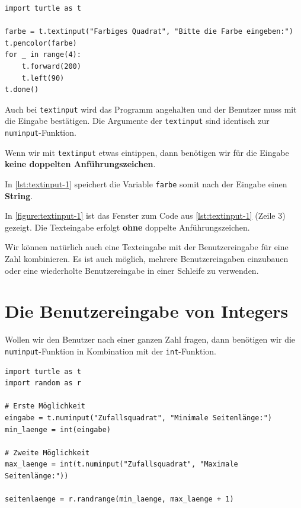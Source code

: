 \begin{lstlisting}[language={python3}, label={lst:textinput-1}, caption={Das Konzept für die Benutzereingabe eines Strings ist praktisch identisch mit dem Konzept für die Benutzereingabe eines Floats.}]
import turtle as t

farbe = t.textinput("Farbiges Quadrat", "Bitte die Farbe eingeben:")
t.pencolor(farbe)
for _ in range(4):
	t.forward(200)
	t.left(90)
t.done()

\end{lstlisting}

Auch bei \lstinline[language={python3}]{textinput} wird das Programm angehalten und der Benutzer muss mit  die Eingabe bestätigen. Die Argumente der \lstinline[language={python3}]{textinput} sind identisch zur \lstinline[language={python3}]{numinput}-Funktion.

\begin{important}
Wenn wir mit \lstinline{textinput} etwas eintippen, dann benötigen wir für die Eingabe \textbf{keine doppelten Anführungszeichen}.
\end{important}

In \autoref{lst:textinput-1} speichert die Variable \lstinline[language={python3}]{farbe} somit nach der Eingabe einen \textbf{String}.

\begin{example}
In \autoref{figure:textinput-1} ist das Fenster zum Code aus \autoref{lst:textinput-1} (Zeile 3) gezeigt. Die Texteingabe erfolgt \textbf{ohne} doppelte Anführungszeichen.
\end{example}

Wir können natürlich auch eine Texteingabe mit der Benutzereingabe für eine Zahl kombinieren. Es ist auch möglich, mehrere Benutzereingaben einzubauen oder eine wiederholte Benutzereingabe in einer Schleife zu verwenden.

\section{Die Benutzereingabe von Integers}

Wollen wir den Benutzer nach einer ganzen Zahl fragen, dann benötigen wir die \lstinline[language={python3}]{numinput}-Funktion in Kombination mit der \lstinline[language={python3}]{int}-Funktion.

\begin{lstlisting}[language={python3}, label={lst:numinput-2}, caption={Wir können eine Variable als Zwischenspeicher für die Eingabe verwenden oder die Funktionsaufrufe verschachteln (Auszug aus dem Quellcode).}]
import turtle as t
import random as r

# Erste Möglichkeit
eingabe = t.numinput("Zufallsquadrat", "Minimale Seitenlänge:")
min_laenge = int(eingabe)

# Zweite Möglichkeit
max_laenge = int(t.numinput("Zufallsquadrat", "Maximale Seitenlänge:"))

seitenlaenge = r.randrange(min_laenge, max_laenge + 1)
\end{lstlisting}

